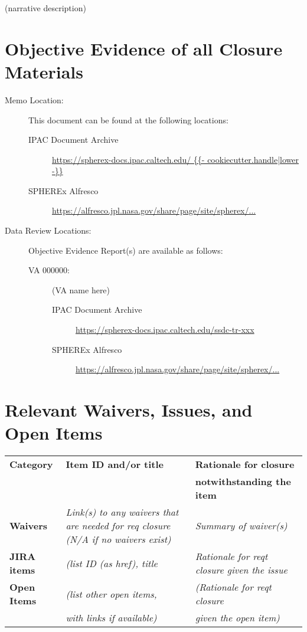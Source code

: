 \documentclass[TR]{spherex}
\begin{document}
(narrative description)

\section*{Objective Evidence of all Closure Materials}


\begin{description}
  \item[Memo Location:] This document can be found at the following locations:
    \begin{description}
      \item[IPAC Document Archive] \url{https://spherex-docs.ipac.caltech.edu/ {{- cookiecutter.handle|lower -}} }
      \item[SPHEREx Alfresco] \url{https://alfresco.jpl.nasa.gov/share/page/site/spherex/...}
    \end{description}
  \item[Data Review Locations:] Objective Evidence Report(s) are available as follows:
    \begin{description}
      \item[VA 000000:] (VA name here)
        \begin{description}
          \item[IPAC Document Archive] \url{https://spherex-docs.ipac.caltech.edu/ssdc-tr-xxx}
          \item[SPHEREx Alfresco] \url{https://alfresco.jpl.nasa.gov/share/page/site/spherex/...}
        \end{description}
    \end{description}
\end{description}


\section*{Relevant Waivers, Issues, and Open Items}

\begin{longtable}{|l|p{}|p{}|}
\hline
\textbf{Category} & \textbf{Item ID and/or title} & \textbf{Rationale for closure} \\
 & & \textbf{notwithstanding the item} \\ \hline\hline
\endhead
\textbf{Waivers} & \textit{Link(s) to any waivers that are needed for req closure (N/A if no waivers exist)} & \textit{Summary of waiver(s)} \\
\hline
\textbf{JIRA items} & \textit{(list ID (as href), title} & \textit{Rationale for reqt closure given the issue} \\
\hline
\textbf{Open Items} & \textit{(list other open items,} & \textit{(Rationale for reqt closure} \\
 & \textit{with links if available)} & \textit{given the open item)} \\
\hline
\end{longtable}


% 
\end{document}
